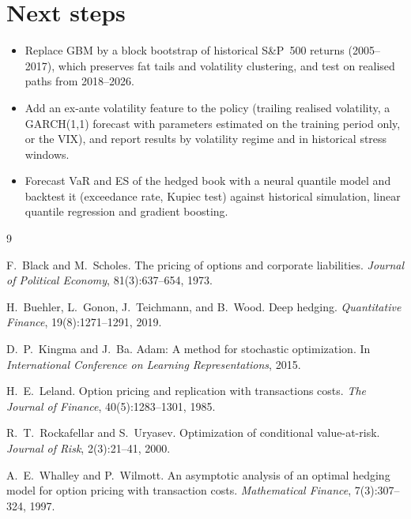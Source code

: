\documentclass[11pt,a4paper]{article}
\begin{document}
\section{Next steps}

\begin{itemize}
  \item Replace GBM by a block bootstrap of historical S\&P~500 returns (2005--2017), which preserves
        fat tails and volatility clustering, and test on realised paths from 2018--2026.
  \item Add an ex-ante volatility feature to the policy (trailing realised volatility, a GARCH(1,1)
        forecast with parameters estimated on the training period only, or the VIX), and report
        results by volatility regime and in historical stress windows.
  \item Forecast VaR and ES of the hedged book with a neural quantile model and backtest it
        (exceedance rate, Kupiec test) against historical simulation, linear quantile regression and
        gradient boosting.
\end{itemize}

\begin{thebibliography}{9}

F.~Black and M.~Scholes.
\newblock The pricing of options and corporate liabilities.
\newblock \emph{Journal of Political Economy}, 81(3):637--654, 1973.

H.~Buehler, L.~Gonon, J.~Teichmann, and B.~Wood.
\newblock Deep hedging.
\newblock \emph{Quantitative Finance}, 19(8):1271--1291, 2019.

D.~P.~Kingma and J.~Ba.
\newblock Adam: A method for stochastic optimization.
\newblock In \emph{International Conference on Learning Representations}, 2015.

H.~E.~Leland.
\newblock Option pricing and replication with transactions costs.
\newblock \emph{The Journal of Finance}, 40(5):1283--1301, 1985.

R.~T.~Rockafellar and S.~Uryasev.
\newblock Optimization of conditional value-at-risk.
\newblock \emph{Journal of Risk}, 2(3):21--41, 2000.

A.~E.~Whalley and P.~Wilmott.
\newblock An asymptotic analysis of an optimal hedging model for option pricing with transaction costs.
\newblock \emph{Mathematical Finance}, 7(3):307--324, 1997.

\end{thebibliography}
\end{document}
